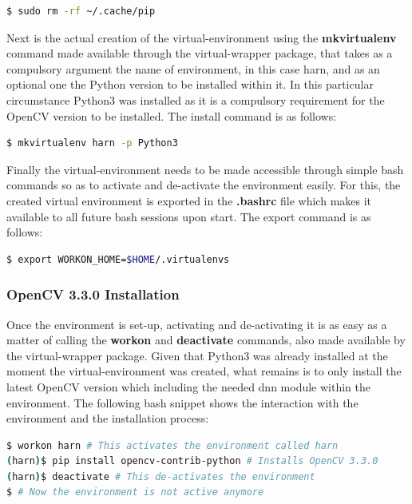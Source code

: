 \begin{lstlisting}[language=bash]
$ sudo rm -rf ~/.cache/pip
\end{lstlisting}

Next is the actual creation of the virtual-environment using the \textbf{mkvirtualenv} command made available through the virtual-wrapper package, that takes as a compulsory argument the name of environment, in this case harn, and as an optional one the Python version to be installed within it. In this particular circumstance Python3 was installed as it is a compulsory requirement for the OpenCV version to be installed. The install command is as follows:

\begin{lstlisting}[language=bash]
$ mkvirtualenv harn -p Python3
\end{lstlisting}

Finally the virtual-environment needs to be made accessible through simple bash commands so as to activate and de-activate the environment easily. For this, the created virtual environment is exported in the \textbf{.bashrc} file which makes it available to all future bash sessions upon start. The export command is as follows:

\begin{lstlisting}[language=bash]
$ export WORKON_HOME=$HOME/.virtualenvs
\end{lstlisting}

\subsubsection{OpenCV 3.3.0 Installation}

Once the environment is set-up, activating and de-activating it is as easy as a matter of calling the \textbf{workon} and \textbf{deactivate} commands, also made available by the virtual-wrapper package. Given that Python3 was already installed at the moment the virtual-environment was created, what remains is to only install the latest OpenCV version which including the needed dnn module within the environment. The following bash snippet shows the interaction with the environment and the installation process:

\begin{lstlisting}[language=bash]
$ workon harn # This activates the environment called harn
(harn)$ pip install opencv-contrib-python # Installs OpenCV 3.3.0
(harn)$ deactivate # This de-activates the environment
$ # Now the environment is not active anymore
\end{lstlisting}

